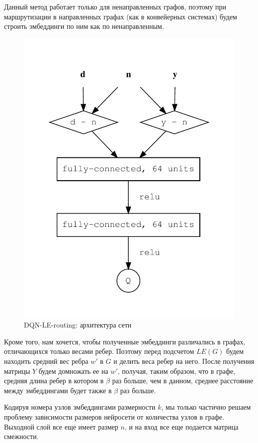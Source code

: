 \documentclass[specification,annotation,times]{itmo-student-thesis}
\theoremstyle{definition}
\begin{document}
Данный метод работает только для ненаправленных графов, поэтому при
маршрутизации в направленных графах (как в конвейерных системах) будем строить
эмбеддинги по ним как по ненаправленным.

\begin{figure}[!h]
  \caption{DQN-LE-routing: архитектура сети}\label{nn-1-one-out}
  \centering
  \includegraphics[scale=0.8]{nn-1-one-out}
\end{figure}

Кроме того, нам хочется, чтобы полученные эмбеддинги различались в графах,
отличающихся только весами ребер. Поэтому перед подсчетом $LE(G)$ будем находить
средний вес ребра $w'$ в $G$ и делить веса ребер на него. После получения
матрицы $Y$ будем домножать ее на $w'$, получая, таким образом, что в графе,
средняя длина ребер в котором в $\beta$ раз больше, чем в данном, среднее
расстояние между эмбеддингами будет также в $\beta$ раз больше.

Кодируя номера узлов эмбеддингами размерности $k$, мы только частично решаем
проблему зависимости размеров нейросети от количества узлов в графе. Выходной
слой все еще имеет размер $n$, и на вход все еще подается матрица смежности.
\end{document}
